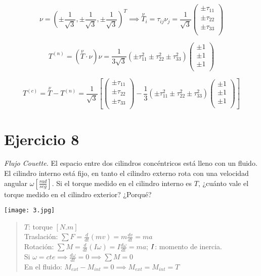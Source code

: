 \documentclass[a4paper,12pt,twoside,final,spanish]{article}
\begin{document}
\dotfill

\[
\nu=\left(\pm\frac{1}{\sqrt{3}},\pm\frac{1}{\sqrt{3}},\pm\frac{1}{\sqrt{3}}\right)^{T}\implies \stackrel \nu T_{i}=\tau_{ij}\nu_{j}=\frac{1}{\sqrt{3}}
\left(\begin{matrix}
\pm\tau_{11} \\
\pm\tau_{22} \\
\pm\tau_{33} \\
\end{matrix}\right)
\]

\[
T^{(n)}=(\stackrel \nu T\cdot\nu)\nu
=\frac{1}{3\sqrt{3}}(\pm\tau_{11}^{2}\pm\tau_{22}^{2}\pm\tau_{33}^{2})
\left(\begin{matrix}
\pm 1 \\
\pm 1 \\
\pm 1 \\
\end{matrix}\right)
\]

\[
T^{(c)}=\stackrel \nu T-T^{(n)}=\frac{1}{\sqrt{3}}
\left[\left(\begin{matrix}
\pm \tau_{11} \\
\pm \tau_{22} \\
\pm \tau_{33} \\
\end{matrix}\right)-\frac{1}{3}(\pm\tau_{11}^2\pm\tau_{22}^2\pm\tau_{33}^2)
\left(\begin{matrix}
\pm 1 \\
\pm 1 \\
\pm 1 \\
\end{matrix}\right)
\right]
\]

\section*{Ejercicio 8}

\textit{Flujo Couette.} El espacio entre dos cilindros concéntricos está lleno con un fluido. El cilindro interno está fijo, en tanto el cilindro externo rota con una velocidad angular $\omega\left[\frac{rad}{seg}\right]$. Si el torque medido en el cilindro interno  es  $T$, ¿cuánto vale el torque medido en el cilindro exterior? ¿Porqué? 

\begin{center}
\texttt{[image: 3.jpg]}
\end{center}

\dotfill

\begin{quote}
$T$: torque $[N.m]$\\

Traslación: $\sum F=\frac{d}{dt}(mv)=m\frac{dv}{dt}=ma$\\

Rotación: $\sum M=\frac{d}{dt}(I\omega)=I\frac{d\omega}{dt}=ma$; $\hfill I$: momento de inercia.\\

Si $\omega=cte\implies\frac{d\omega}{dt}=0\implies\sum M=0$\\

En el fluido: $M_{ext}-M_{int}=0\implies M_{ext}=M_{int}=T$
\end{quote}
\end{document}
